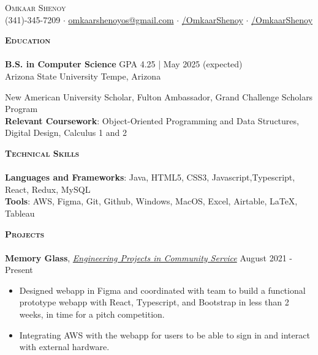 \documentclass[a4paper]{article}
\newcommand{\lineunder} {
    \vspace*{-8pt} \\
    \hspace*{-18pt} \hrulefill \\
}
\newcommand{\header} [1] {
    {\hspace*{-15pt}\vspace*{3pt} \textsc{#1}}
    \vspace*{-6pt} \lineunder
}
\begin{document}
\vspace*{-30.9pt}



{\begin{center}
	{\Huge \scshape {Omkaar Shenoy}}\\
	\vspace{2mm}
	\faPhone  \hspace{0.5mm} (341)-345-7209 $\cdot$ \href{mailto:omkaarshenoyos@gmail.com}{\faEnvelope \hspace{0.5mm} omkaarshenoyos@gmail.com} \hspace{0.5mm}   $\cdot$ \href{https://www.linkedin.com/in/OmkaarShenoy/}{\faLinkedin/OmkaarShenoy} $\cdot$ \href{https://github.com/OmkaarShenoy}{\faGithub/OmkaarShenoy}
	
\end{center}


    \header{\textbf{Education}}

    \textbf{B.S. in Computer Science} \hfill GPA 4.25 | May 2025 (expected)
\\ Arizona State University \hfill Tempe, Arizona
 
New American University Scholar, Fulton Ambassador, Grand Challenge Scholars Program\\
\textbf{Relevant Coursework}: Object-Oriented Programming and Data Structures, Digital Design, Calculus 1 and 2 \\


\vspace{1mm}

\header{\textbf{Technical Skills}}

\textbf{Languages and Frameworks}: Java, HTML5, CSS3, Javascript,Typescript, React, Redux, MySQL \\
\textbf{Tools}: AWS, Figma, Git, Github, Windows, MacOS, Excel, Airtable, \LaTeX, Tableau \\
\vspace{1mm}


\header{\textbf{Projects}}
\textbf{Memory Glass},  \href{https://epics.engineering.asu.edu/}{\textit{Engineering Projects in Community Service}} \faExternalLink
\hfill August 2021 - Present\\
\vspace{-3mm}
\begin{itemize}
    \itemsep-0.05em
    \item Designed webapp in Figma and coordinated with team to build a functional prototype webapp with React, Typescript, and Bootstrap in less than 2 weeks, in time for a pitch competition. 
    \item Integrating AWS with the webapp for users to be able to sign in and interact with external hardware.
    

\end{itemize}}
\end{document}
